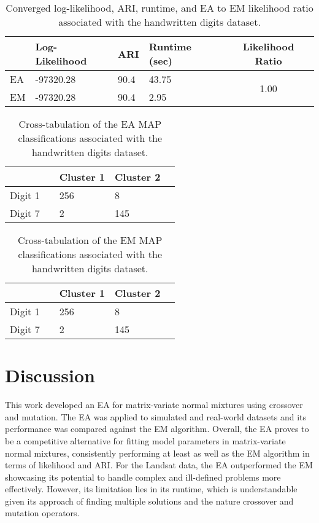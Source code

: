 \documentclass[12pt, centerh1]{article}
\begin{document}
\begin{table}[!htbp]
  \caption{Converged log-likelihood, ARI, runtime, and EA to EM likelihood ratio associated with the handwritten digits dataset.}
        \label{table:digits_results}
  \begin{tabularx}{\textwidth}{l *{3}{X}c}
  \toprule
    &\textbf{Log-Likelihood}& \textbf{ARI} & \textbf{Runtime (sec)} & \textbf{Likelihood Ratio} \\
  \midrule
  EA & -97320.28     & 90.4 &  43.75 & \multirow{2}{*}{1.00}  \\
  EM & -97320.28    & 90.4 & 2.95  \\
  \bottomrule
  \end{tabularx}
\end{table}


\begin{table}[!htbp]
  \caption{Cross-tabulation of the EA MAP classifications associated with the handwritten digits dataset.}
        \label{table:digits_EA}
  \begin{tabularx}{\textwidth}{l *{4}{X}}
  \toprule
   && \textbf{Cluster 1}  & \textbf{Cluster 2}  \\
  \midrule
  Digit 1 && 256 & 8 \\
  Digit 7 && 2 &  145 \\
  \bottomrule
  \end{tabularx}
\end{table}

\begin{table}[!ht]
  \caption{Cross-tabulation of the EM MAP classifications associated with the handwritten digits dataset.}
          \label{table:digits_EM}
  \begin{tabularx}{\textwidth}{l *{4}{X}}
  \toprule
   && \textbf{Cluster 1}  & \textbf{Cluster 2} \\
  \midrule
  Digit 1 && 256 & 8 \\
  Digit 7 && 2 &  145 \\
  \bottomrule
  \end{tabularx}
\end{table}




\newpage
\section{Discussion}
This work developed an EA for matrix-variate normal mixtures using crossover and mutation. The EA was applied to simulated and real-world datasets and its performance was compared against the EM algorithm. Overall, the EA proves to be a competitive alternative for fitting model parameters in matrix-variate normal mixtures, consistently performing at least as well as the EM algorithm in terms of likelihood and ARI. For the Landsat data, the EA outperformed the EM showcasing its potential to handle complex and ill-defined problems more effectively. However, its limitation lies in its runtime, which is understandable given its approach of finding multiple solutions and the nature crossover and mutation operators. 
\end{document}
